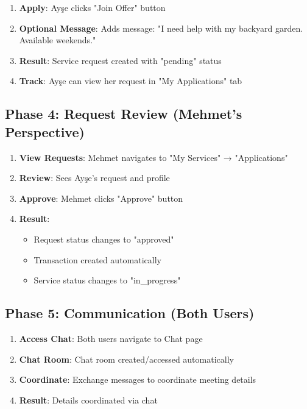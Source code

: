\documentclass[12pt,a4paper]{report}
\begin{document}
\begin{enumerate}
    \item \textbf{Apply}: Ayşe clicks "Join Offer" button
    \item \textbf{Optional Message}: Adds message: "I need help with my backyard garden. Available weekends."
    \item \textbf{Result}: Service request created with "pending" status
    \item \textbf{Track}: Ayşe can view her request in "My Applications" tab
\end{enumerate}

\subsection{Phase 4: Request Review (Mehmet's Perspective)}

\begin{enumerate}
    \item \textbf{View Requests}: Mehmet navigates to "My Services" → "Applications"
    \item \textbf{Review}: Sees Ayşe's request and profile
    \item \textbf{Approve}: Mehmet clicks "Approve" button
    \item \textbf{Result}:
          \begin{itemize}
              \item Request status changes to "approved"
              \item Transaction created automatically
              \item Service status changes to "in\_progress"
          \end{itemize}
\end{enumerate}

\subsection{Phase 5: Communication (Both Users)}

\begin{enumerate}
    \item \textbf{Access Chat}: Both users navigate to Chat page
    \item \textbf{Chat Room}: Chat room created/accessed automatically
    \item \textbf{Coordinate}: Exchange messages to coordinate meeting details
    \item \textbf{Result}: Details coordinated via chat
\end{enumerate}
\end{document}
